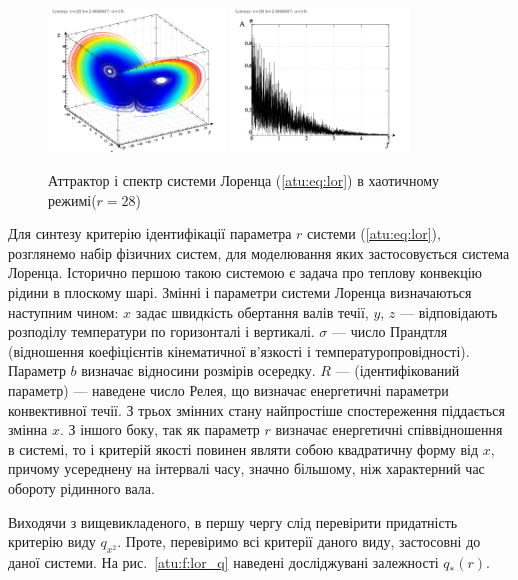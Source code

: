 \documentclass[a4paper,13pt]{atuaref}
\begin{document}
\begin{figure}[ht!]
\begin{center}
  \includegraphics[width=0.42\textwidth]{p5/p/cha/lor/lor0-p_xyz_r=028.png}
  \hfill
  \includegraphics[width=0.42\textwidth]{p5/p/cha/lor/lor0_fft-p_f_r=028.png}
\end{center}
  \caption{Аттрактор і спектр системи Лоренца (\ref{atu:eq:lor}) в хаотичному режимі($r=28$)}
\label{atu:f:lor_attractor_phase_chaos28}
\end{figure}

Для синтезу критерію ідентифікації параметра $ r $ системи
(\ref{atu:eq:lor}), розглянемо набір фізичних систем, для моделювання яких застосовується
система Лоренца. Історично першою такою системою є задача про теплову
конвекцію рідини в плоскому шарі.
Змінні і параметри системи Лоренца визначаються наступним чином: $ x $ задає
швидкість обертання валів течії, $ y $, $ z $ --- відповідають розподілу
температури по горизонталі і вертикалі. $ \sigma $ --- число Прандтля
(відношення коефіцієнтів кінематичної в'язкості і температуропровідності).
Параметр $ b $ визначає відносини розмірів осередку. $ R $ --- (ідентифікований
параметр) --- наведене число Релея, що визначає енергетичні параметри
конвективної течії.
З трьох змінних стану найпростіше спостереження піддається змінна $ x $.
З іншого боку, так як параметр $ r $ визначає енергетичні співвідношення в
системі, то і критерій якості повинен являти собою квадратичну форму від $ x $,
причому усереднену на інтервалі часу, значно більшому, ніж характерний час
обороту рідинного вала.

Виходячи з вищевикладеного, в першу чергу слід перевірити придатність критерію
виду $ q_{x^2} $. Проте, перевіримо всі критерії даного виду, застосовні до
даної системи. На рис.~\ref{atu:f:lor_q} наведені досліджувані залежності
$q_{*}(r)$.
\end{document}
